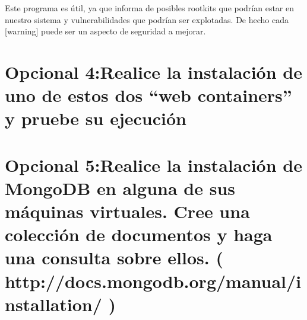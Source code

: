 	Este programa es útil, ya que informa de posibles rootkits que podrían estar en nuestro sistema y vulnerabilidades que podrían ser explotadas. De hecho cada [warning] puede ser un aspecto de seguridad a mejorar.
	
	
	\section{Opcional 4:Realice la instalación de uno de estos dos “web containers” y pruebe su ejecución}
	
	
	
	
	\section{Opcional 5:Realice la instalación de MongoDB en alguna de sus máquinas virtuales. Cree una colección de documentos y haga una consulta sobre ellos. ( http://docs.mongodb.org/manual/installation/ )}	
	

	
	




